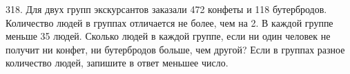318. Для двух групп экскурсантов заказали 472 конфеты и 118 бутербродов. Количество людей в группах отличается не более, чем на 2. В каждой группе меньше 35 людей. Сколько людей в каждой группе, если ни один человек не получит ни конфет, ни бутербродов больше, чем другой? Если в группах разное количество людей, запишите в ответ меньшее число.\\
